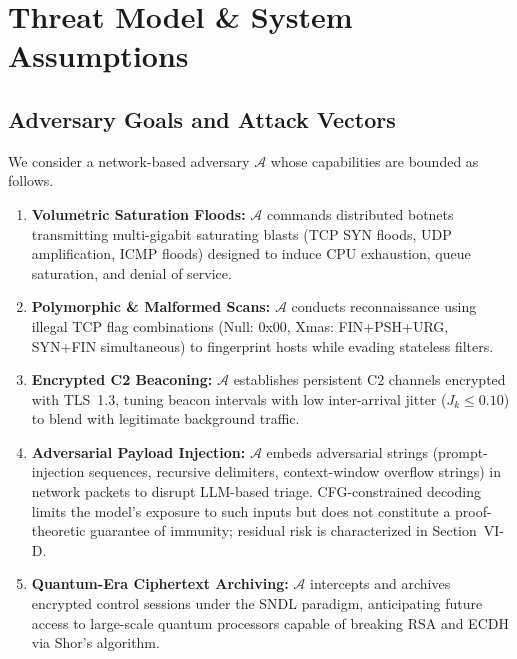 \documentclass{ieeeaccess}
\renewcommand{\_}{\textunderscore\allowbreak}
\begin{document}
\section{Threat Model \& System Assumptions}
\subsection{Adversary Goals and Attack Vectors}
We consider a network-based adversary $\mathcal{A}$ whose capabilities are
bounded as follows.
\begin{enumerate}
  \item \textbf{Volumetric Saturation Floods:} $\mathcal{A}$ commands distributed
    botnets transmitting multi-gigabit saturating blasts (TCP SYN floods, UDP
    amplification, ICMP floods) designed to induce CPU exhaustion, queue
    saturation, and denial of service.

  \item \textbf{Polymorphic \& Malformed Scans:} $\mathcal{A}$ conducts
    reconnaissance using illegal TCP flag combinations (Null: 0x00, Xmas:
    FIN+PSH+URG, SYN+FIN simultaneous) to fingerprint hosts while evading
    stateless filters.

  \item \textbf{Encrypted C2 Beaconing:} $\mathcal{A}$ establishes persistent C2
    channels encrypted with TLS~1.3, tuning beacon intervals with low inter-arrival
    jitter ($J_k \leq 0.10$) to blend with legitimate background traffic.

  \item \textbf{Adversarial Payload Injection:} $\mathcal{A}$ embeds adversarial
    strings (prompt-injection sequences, recursive delimiters, context-window
    overflow strings) in network packets to disrupt LLM-based triage.
    CFG-constrained decoding limits the model's exposure to such inputs but does
    not constitute a proof-theoretic guarantee of immunity; residual risk is
    characterized in Section~VI-D.

  \item \textbf{Quantum-Era Ciphertext Archiving:} $\mathcal{A}$ intercepts and
    archives encrypted control sessions under the SNDL paradigm, anticipating
    future access to large-scale quantum processors capable of breaking RSA and
    ECDH via Shor's algorithm.
\end{enumerate}
\end{document}
